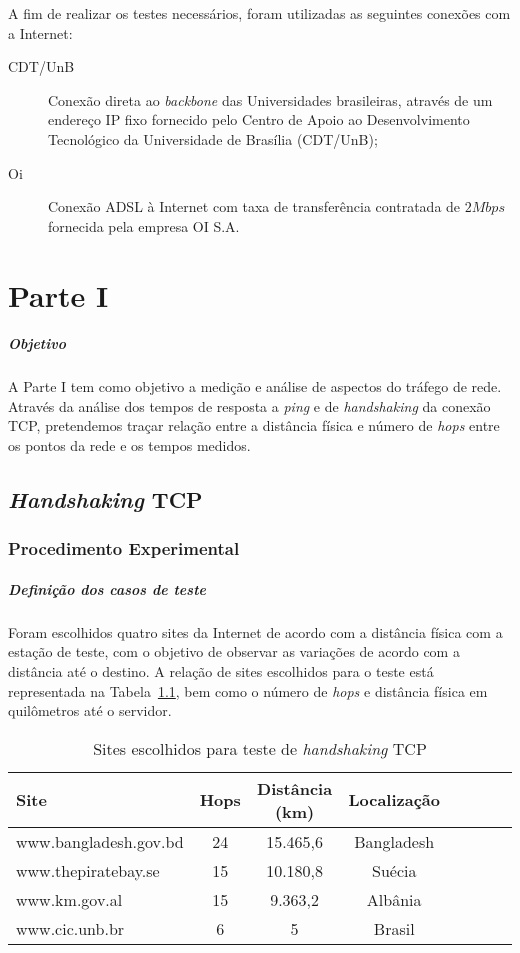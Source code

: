 \documentclass[12pt,a4paper]{report}
\begin{document}
A fim de realizar os testes necessários, foram utilizadas as seguintes conexões com a Internet:

\begin{description}
\item[CDT/UnB] Conexão direta ao \textit{backbone} das Universidades brasileiras, através de um endereço IP fixo fornecido pelo Centro de Apoio ao Desenvolvimento Tecnológico da Universidade de Brasília (CDT/UnB);
\item[Oi] Conexão ADSL à Internet com taxa de transferência contratada de \(2Mbps\) fornecida pela empresa OI S.A.
\end{description}

\chapter{Parte I}

\paragraph{Objetivo} A Parte I tem como objetivo a medição e análise de aspectos do tráfego de rede. Através da análise dos tempos de resposta a \textit{ping} e de \textit{handshaking} da conexão TCP, pretendemos traçar relação entre a distância física e número de \textit{hops} entre os pontos da rede e os tempos medidos.

\section{\textit{Handshaking} TCP}

\subsection{Procedimento Experimental}

\paragraph{Definição dos casos de teste} Foram escolhidos quatro sites da Internet de acordo com a distância física com a estação de teste, com o objetivo de observar as variações de acordo com a distância até o destino. A relação de sites escolhidos para o teste está representada na Tabela~\ref{tab:siteshandshaking}, bem como o número de \textit{hops} e distância física em quilômetros até o servidor.

\begin{table}[h]
	\center
	\begin{tabular}{l*{6}{c}r}
	Site						& Hops	& Distância (km)	& Localização\\
	\hline
	www.bangladesh.gov.bd		& 24		& 15.465,6		& Bangladesh\\
	www.thepiratebay.se		& 15		& 10.180,8		& Suécia\\
	www.km.gov.al				& 15		& 9.363,2			& Albânia\\
	www.cic.unb.br				& 6		& 5				& Brasil\\
	\end{tabular}
	\caption{Sites escolhidos para teste de \textit{handshaking} TCP}
	\label{tab:siteshandshaking}
\end{table}
\end{document}
